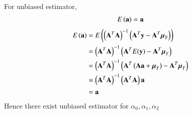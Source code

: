 \documentclass[journal,12pt,onecolumn]{IEEEtran}
\providecommand{\mtx}[1]{\mathbf{#1}}
\theoremstyle{remark}
\begin{document}
For unbiased estimator, 
\begin{align}
E\left(\mathbf{a}\right)=\mathbf{a}
\end{align}
\begin{align}
E\left(\mathbf{a}\right)&=E\left(\left({\mathbf{A}}^T\mathbf{A}\right)^{-1}\left({\mathbf{A}}^T\mathbf{y}-\mathbf{A}^T\mathbf{\boldsymbol{\mu}}_{Y}\right)\right)\\
&=\left({\mathbf{A}}^T\mathbf{A}\right)^{-1}\left({\mathbf{A}}^TE(\mathbf{y})-\mathbf{A}^T\mathbf{\boldsymbol{\mu}}_{Y}\right)\\
&=\left({\mathbf{A}}^T\mathbf{A}\right)^{-1}\left({\mathbf{A}}^T\left(\mathbf{A}\mathbf{a}+\mathbf{\boldsymbol{\mu}}_{Y}\right)-\mathbf{A}^T\mathbf{\boldsymbol{\mu}}_{Y}\right)\\
&=\left({\mathbf{A}}^T\mathbf{A}\right)^{-1}\left({\mathbf{A}}^T\mathbf{A}\right)\mathbf{a}\\
&=\mathbf{a}
\end{align}
Hence there exist unbiased estimator for ${\alpha}_0, {\alpha}_1, {\alpha}_2$
\end{document}
